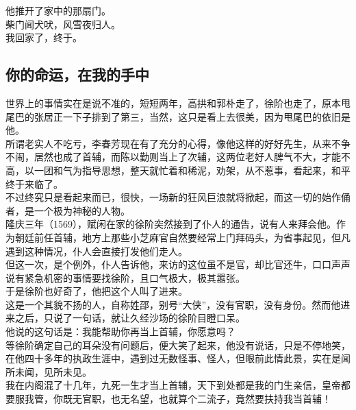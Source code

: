 \begin{multicols}{\theparacolNo}
他推开了家中的那扇门。\\

柴门闻犬吠，风雪夜归人。\\

我回家了，终于。\\

\subsection{你的命运，在我的手中}
世界上的事情实在是说不准的，短短两年，高拱和郭朴走了，徐阶也走了，原本甩尾巴的张居正一下子排到了第三，当然，这只是看上去很美，因为甩尾巴的依旧是他。\\

所谓老实人不吃亏，李春芳现在有了充分的心得，像他这样的好好先生，从来不争不闹，居然也成了首辅，而陈以勤则当上了次辅，这两位老好人脾气不大，才能不高，以一团和气为指导思想，整天就忙着和稀泥，劝架，从不惹事，看起来，和平终于来临了。\\

不过终究只是看起来而已，很快，一场新的狂风巨浪就将掀起，而这一切的始作俑者，是一个极为神秘的人物。\\

隆庆三年（1569），赋闲在家的徐阶突然接到了仆人的通告，说有人来拜会他。作为朝廷前任首辅，地方上那些小芝麻官自然要经常上门拜码头，为省事起见，但凡遇到这种情况，仆人会直接打发他们走人。\\

但这一次，是个例外，仆人告诉他，来访的这位虽不是官，却比官还牛，口口声声说有紧急机密的事情要找徐阶，且口气极大，极其嚣张。\\

于是徐阶也好奇了，他把这个人叫了进来。\\

这是一个其貌不扬的人，自称姓邵，别号“大侠”，没有官职，没有身份。然而他进来之后，只说了一句话，就让久经沙场的徐阶目瞪口呆。\\

他说的这句话是：我能帮助你再当上首辅，你愿意吗？\\

等徐阶确定自己的耳朵没有问题后，便大笑了起来，他没有说话，只是不停地笑，在他四十多年的执政生涯中，遇到过无数怪事、怪人，但眼前此情此景，实在是闻所未闻，见所未见。\\

我在内阁混了十几年，九死一生才当上首辅，天下到处都是我的门生亲信，皇帝都要服我管，你既无官职，也无名望，也就算个二流子，竟然要扶持我当首辅！\\


\end{multicols}

